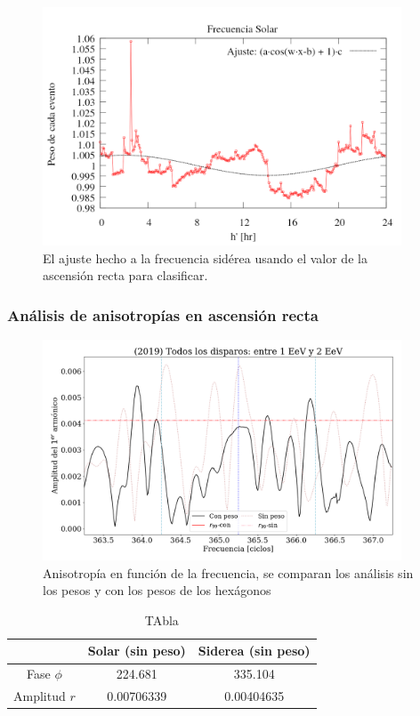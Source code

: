 		
		
		\begin{figure}[H]
			\centering
			\includegraphics[width=0.95\textwidth]{eventos_hora_local_ajuste_cos.png}
			\caption{El ajuste hecho a la frecuencia sidérea usando el valor de la ascensión recta para clasificar.}
		\end{figure}
		
	\subsubsection{Análisis de anisotropías en ascensión recta}
		
		\begin{figure}[H]
			\centering
			\includegraphics[width=0.95\textwidth]{pesos_sin_con_1_2_EeV.png}
			\caption{Anisotropía en función de la frecuencia, se comparan los análisis sin los pesos y con los pesos de los hexágonos}
		\end{figure}
		
		
		\begin{table}[H]
		\centering
		\begin{tabular}{c|c|c}
					& Solar (sin peso)		& Siderea (sin peso)  \\ \hline
		Fase $\phi$ & 224.681	    		& 335.104			\\
		Amplitud $r$& 0.00706339	    	&0.00404635			\\
		\end{tabular}
		\caption{TAbla}
		
		\end{table}
		

